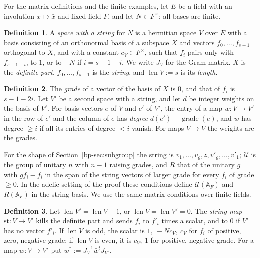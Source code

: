 \documentclass[reqno]{amsart}
\theoremstyle{definition}
\newtheorem{definition}{Definition}[section]
\theoremstyle{plain}
\theoremstyle{remark}
\newcommand{\A}{\mathbb{A}}
\newcommand{\Uc}{\mathcal{U}}
\newcommand{\st}{\mathrm{st}}
\newcommand{\len}{\operatorname{len}}
\begin{document}
For the matrix definitions and the finite examples, let \(E\) be a field with an involution \(x\mapsto\bar x\) and fixed field \(F\), and let \(N\in F^\times\); all bases are finite.

\begin{definition}\label{def:string}
A \emph{space with a string} for \(N\) is a hermitian space \(V\) over \(E\) with a basis consisting of an orthonormal basis of a subspace \(X\) and vectors \(f_0,\dots,f_{s-1}\) orthogonal to \(X\), and with a constant \(c_V\in F^\times\), such that \(f_i\) pairs only with \(f_{s-1-i}\), to \(1\), or to \(-N\) if \(i=s-1-i\).  We write \(J_V\) for the Gram matrix.  \(X\) is the \emph{definite part}, \(f_0,\dots,f_{s-1}\) is the \emph{string}, and \(\len V:=s\) is its \emph{length}.
\end{definition}

\begin{definition}\label{def:degree}
The \emph{grade} of a vector of the basis of \(X\) is \(0\), and that of \(f_i\) is \(s-1-2i\).  Let \(V'\) be a second space with a string, and let \(d\) be integer weights on the basis of \(V'\).  For basis vectors \(e\) of \(V\) and \(e'\) of \(V'\), the entry of a map \(w\colon V\to V'\) in the row of \(e'\) and the column of \(e\) has \emph{degree} \(d(e')-\operatorname{grade}(e)\), and \(w\) has degree \(\ge i\) if all its entries of degree \(<i\) vanish.  For maps \(V\to V\) the weights are the grades.
\end{definition}

For the shape of Section~\ref{bp-sec:subgroup} the string is \(v_1,\dots,v_\varrho,z,v'_\varrho,\dots,v'_1\); \(\Uc\) is the group of unitary \(n\) with \(n-1\) raising grades, and \(R\) that of the unitary \(g\) with \(gf_i-f_i\) in the span of the string vectors of larger grade for every \(f_i\) of grade \(\ge0\).  In the adelic setting of the proof these conditions define \(\Uc(\A_F)\) and \(R(\A_F)\) in the string basis.  We use the same matrix conditions over finite fields.

\begin{definition}\label{def:stringmap}
Let \(\len V'=\len V-1\), or \(\len V=\len V'=0\).  The \emph{string map} \(\st\colon V\to V'\) kills the definite part and sends \(f_i\) to \(f'_i\) times a scalar, and to \(0\) if \(V'\) has no vector \(f'_i\).  If \(\len V\) is odd, the scalar is \(1,\ -Nc_V,\ c_V\) for \(f_i\) of positive, zero, negative grade; if \(\len V\) is even, it is \(c_V,\ 1\) for positive, negative grade.  For a map \(w\colon V\to V'\) put \(w^*:=J_V^{-1}\bar w^{t}J_{V'}\).
\end{definition}
\end{document}
